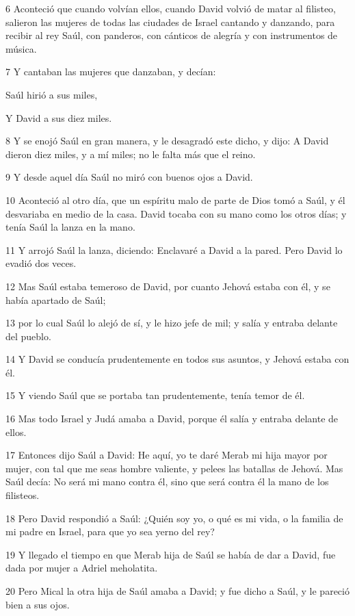 \par 6 Aconteció que cuando volvían ellos, cuando David volvió de matar al filisteo, salieron las mujeres de todas las ciudades de Israel cantando y danzando, para recibir al rey Saúl, con panderos, con cánticos de alegría y con instrumentos de música.
\par 7 Y cantaban las mujeres que danzaban, y decían:
\par Saúl hirió a sus miles,
\par Y David a sus diez miles. 
\par 8 Y se enojó Saúl en gran manera, y le desagradó este dicho, y dijo: A David dieron diez miles, y a mí miles; no le falta más que el reino.
\par 9 Y desde aquel día Saúl no miró con buenos ojos a David. 
\par 10 Aconteció al otro día, que un espíritu malo de parte de Dios tomó a Saúl, y él desvariaba en medio de la casa. David tocaba con su mano como los otros días; y tenía Saúl la lanza en la mano.
\par 11 Y arrojó Saúl la lanza, diciendo: Enclavaré a David a la pared. Pero David lo evadió dos veces.
\par 12 Mas Saúl estaba temeroso de David, por cuanto Jehová estaba con él, y se había apartado de Saúl;
\par 13 por lo cual Saúl lo alejó de sí, y le hizo jefe de mil; y salía y entraba delante del pueblo.
\par 14 Y David se conducía prudentemente en todos sus asuntos, y Jehová estaba con él.
\par 15 Y viendo Saúl que se portaba tan prudentemente, tenía temor de él.
\par 16 Mas todo Israel y Judá amaba a David, porque él salía y entraba delante de ellos.
\par 17 Entonces dijo Saúl a David: He aquí, yo te daré Merab mi hija mayor por mujer, con tal que me seas hombre valiente, y pelees las batallas de Jehová. Mas Saúl decía: No será mi mano contra él, sino que será contra él la mano de los filisteos.
\par 18 Pero David respondió a Saúl: ¿Quién soy yo, o qué es mi vida, o la familia de mi padre en Israel, para que yo sea yerno del rey?
\par 19 Y llegado el tiempo en que Merab hija de Saúl se había de dar a David, fue dada por mujer a Adriel meholatita.
\par 20 Pero Mical la otra hija de Saúl amaba a David; y fue dicho a Saúl, y le pareció bien a sus ojos.
